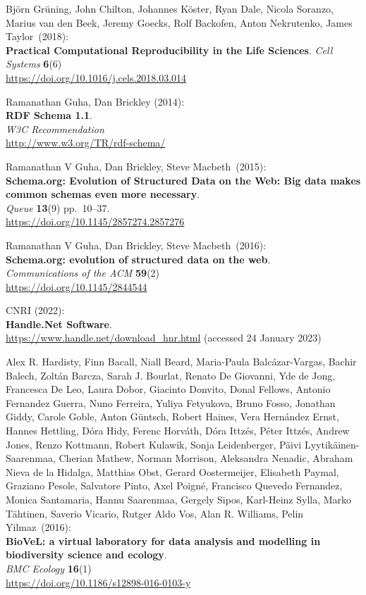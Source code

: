 \begin{thebibliography}{9}
Björn Grüning, John Chilton, Johannes Köster, Ryan Dale, Nicola
Soranzo, Marius van den Beek, Jeremy Goecks, Rolf Backofen, Anton
Nekrutenko, James Taylor~(2018):\\
\textbf{Practical Computational Reproducibility in the Life Sciences}.
\emph{Cell Systems} \textbf{6}(6)\\
\url{https://doi.org/10.1016/j.cels.2018.03.014}

Ramanathan Guha, Dan Brickley (2014): \\
\textbf{RDF Schema 1.1}.\\
\emph{W3C Recommendation} \\
\url{http://www.w3.org/TR/rdf-schema/}

Ramanathan V Guha, Dan Brickley, Steve Macbeth~(2015):\\
\textbf{Schema.org: Evolution of Structured Data on the Web: Big data
makes common schemas even more necessary}.\\
\emph{Queue} \textbf{13}(9) pp.~10--37.\\
\url{https://doi.org/10.1145/2857274.2857276}

Ramanathan V Guha, Dan Brickley, Steve Macbeth~(2016):\\
\textbf{Schema.org: evolution of structured data on the web}.\\
\emph{Communications of the ACM} \textbf{59}(2)\\
\url{https://doi.org/10.1145/2844544}

CNRI (2022): \\
\textbf{Handle.Net Software}. \\
\url{https://www.handle.net/download_hnr.html} (accessed 24 January
2023)

Alex R. Hardisty, Finn Bacall, Niall Beard, Maria-Paula Balcázar-Vargas, Bachir Balech, Zoltán Barcza, Sarah J. Bourlat, Renato De Giovanni, Yde de Jong, Francesca De Leo, Laura Dobor, Giacinto Donvito, Donal Fellows, Antonio Fernandez Guerra, Nuno Ferreira, Yuliya Fetyukova, Bruno Fosso, Jonathan Giddy, Carole Goble, Anton Güntsch, Robert Haines, Vera Hernández Ernst, Hannes Hettling, Dóra Hidy, Ferenc Horváth, Dóra Ittzés, Péter Ittzés, Andrew Jones, Renzo Kottmann, Robert Kulawik, Sonja Leidenberger, Päivi Lyytikäinen-Saarenmaa, Cherian Mathew, Norman Morrison, Aleksandra Nenadic, Abraham Nieva de la Hidalga, Matthias Obst, Gerard Oostermeijer, Elisabeth Paymal, Graziano Pesole, Salvatore Pinto, Axel Poigné, Francisco Quevedo Fernandez, Monica Santamaria, Hannu Saarenmaa, Gergely Sipos, Karl-Heinz Sylla, Marko Tähtinen, Saverio Vicario, Rutger Aldo Vos, Alan R. Williams, Pelin Yilmaz~(2016):\\
\textbf{BioVeL: a virtual laboratory for data analysis and modelling in biodiversity science and ecology}.\\
\emph{BMC Ecology} \textbf{16}(1)\\
\url{https://doi.org/10.1186/s12898-016-0103-y}


\end{thebibliography}

